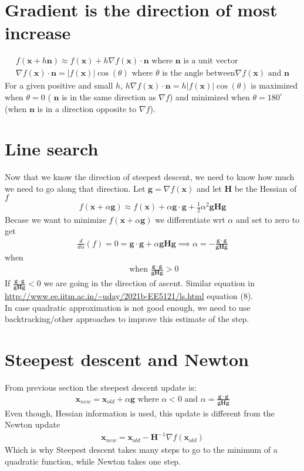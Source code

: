 \documentclass{article}
\newcommand{\ber}{\begin{eqnarray}}
\newcommand{\eer}{\end{eqnarray}}
\newcommand{\dd}[2]{\frac{d}{d{#2}}{(#1)} }
\begin{document}
\section{Gradient is the direction of most increase}
\ber
f(\pmb{x} + h\pmb{n}) \approx f(\pmb{x}) + h\nabla{f(\pmb{x})}\cdot\pmb{n} \text{ where } \pmb{n} \text{ is a unit vector} \\
\nabla{f(\pmb{x})}\cdot\pmb{n} = |f(\pmb{x})|\cos(\theta) \text{ where } \theta \text{ is the angle between} \nabla{}f(\pmb{x}) \text{ and } \pmb{n} 
\eer
For a given positive and small $h$, $h\nabla{f(\pmb{x})}\cdot\pmb{n} = h|f(\pmb{x})|\cos(\theta) $ is maximized when $\theta=0$ ( $\pmb{n}$ is in the same direction as $\nabla{f}$) and minimized when $\theta=180^{\circ}$ (when $\pmb{n}$ is in a direction opposite to $\nabla{}f$).
%
%
%
\section{Line search}
Now that we know the direction of steepest descent, we need to know how much we need to go along that direction. Let $\pmb{g}=\nabla{}f(\pmb{x})$ and let $\pmb{H}$ be the Hessian of $f$
\ber
f(\pmb{x} + \alpha\pmb{g}) \approx f(\pmb{x}) + \alpha\pmb{g}\cdot\pmb{g} + \frac{1}{2}\alpha^2\pmb{g}\pmb{H}\pmb{g}
\eer
Becase we want to minimize $f(\pmb{x} + \alpha\pmb{g})$ we differentiate wrt $\alpha$ and set to zero to get
\ber
\dd{f}{\alpha} = 0 = \pmb{g}\cdot\pmb{g} + \alpha\pmb{g}\pmb{H}\pmb{g} \implies \alpha = -\frac{\pmb{g}\cdot\pmb{g}}{\pmb{g}\pmb{H}\pmb{g}} 
\eer
when
\ber
\text{ when }\frac{\pmb{g}\cdot\pmb{g}}{\pmb{g}\pmb{H}\pmb{g}} > 0
\eer
If $\frac{\pmb{g}\cdot\pmb{g}}{\pmb{g}\pmb{H}\pmb{g}}<0$ we are going in the direction of ascent.
Similar equation in \url{http://www.ee.iitm.ac.in/~uday/2021b-EE5121/ls.html} equation (8). \\
In case quadratic approximation is not good enough, we need to use backtracking/other approaches to improve this estimate of the step.
%
%
\section{Steepest descent and Newton}
From previous section the steepest descent update is:
\ber
\pmb{x}_{new} = \pmb{x}_{old} + \alpha\pmb{g} \text{ where } \alpha < 0 \text{ and }  \alpha = \frac{\pmb{g}\cdot\pmb{g}}{\pmb{g}\pmb{H}\pmb{g}}
\eer
Even though, Hessian information is used, this update is different from the Newton update
\ber
\pmb{x}_{new} = \pmb{x}_{old} - \pmb{H}^{-1}\nabla{f(\pmb{x}_{old})}
\eer
Which is why Steepest descent takes many steps to go to the minimum of a quadratic function, while Newton takes one step.
\end{document}

